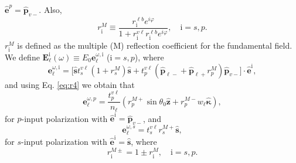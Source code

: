 $\hat{\mathbf{e}}^{p}=\hat{\mathbf{p}}_{v-}$. Also,
\begin{equation}\label{mvrm}
r^{M}_{\mathrm{i}} \equiv
\frac{r^{\ell b}_{\mathrm{i}}e^{i\varphi}}{1+r^{v\ell}_{\mathrm{i}}
r^{\ell b}_{\mathrm{i}}e^{i\varphi}}, \quad \mathrm{i}=s,p.
\end{equation}
$r^{M}_{\mathrm{i}}$ is defined as the multiple (M) reflection coefficient for
the fundamental field. We define $\mathbf{E}^{\mathrm{i}}_{\ell}(\omega)\equiv
E_{0}\mathbf{e}^{\omega,\mathrm{i}}_{\ell}$ ($\mathrm{i}=s,p$), where
\begin{equation}\label{eq:mcvew2}
\mathbf{e}^{\omega,\mathrm{i}}_\ell 
= \Big[\hat{\mathbf{s}} t^{v\ell}_s(1+r^M_s)\hat{\mathbf{s}} 
+ t^{v\ell}_p\left(\hat{\mathbf{p}}_{\ell-}+\hat{\mathbf{p}}_{\ell+}r^{M}_p 
\right)\hat{\mathbf{p}}_{v-}
\Big]\cdot\hat{\mathbf{e}}^{\mathrm{i}},
\end{equation}
and using Eq. \eqref{eq:r4} we obtain that
\begin{equation}\label{eq:mcvep}
\mathbf{e}^{\omega,p}_{\ell}=\frac{t^{v\ell}_{p}}{n_{\ell}}
\left( 
  r^{M+}_{p}\sin\theta_{0}\hat{\mathbf{z}}
+ r^{M-}_{p}w_{\ell}\hat{\boldsymbol{\kappa}}
\right),
\end{equation} 
for $p$-input polarization with
$\hat{\mathbf{e}}^{\mathrm{i}}=\hat{\mathbf{p}}_{v-}$, and
\begin{equation}\label{eq:mcves}
\mathbf{e}^{\omega,s}_\ell=t^{v\ell}_{s}r^{M+}_{s}\hat{\mathbf{s}},
\end{equation}
for $s$-input polarization with
$\hat{\mathbf{e}}^{\mathrm{i}}=\hat{\mathbf{s}}$, where
\begin{equation}\label{eq:mvc}
r^{M\pm}_{\mathrm{i}}=1\pm r^{M}_{\mathrm{i}},\quad \mathrm{i} = s,p.
\end{equation}

